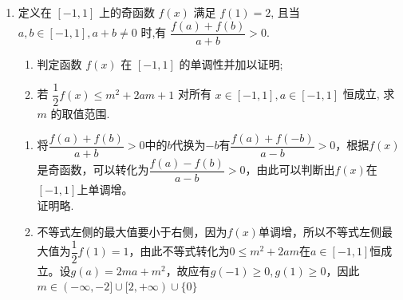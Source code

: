 \begin{enumerate}
\item 定义在 $[-1,1]$ 上的奇函数 $f(x)$ 满足 $f(1)=2$, 且当 $a, b \in[-1,1], a+b \neq 0$ 时,有 $\dfrac{f(a)+f(b)}{a+b}>0$.
\begin{enumerate}
    \item 判定函数 $f(x)$ 在 $[-1,1]$ 的单调性并加以证明;
    \item 若 $\dfrac{1}{2} f(x) \leq m^2+2 a m+1$ 对所有 $x \in[-1,1], a \in[-1,1]$ 恒成立, 求 $m$ 的取值范围.
\end{enumerate}
\begin{jieda}
    \begin{enumerate}
        \item 将$\dfrac{f(a)+f(b)}{a+b}>0$中的$b$代换为$-b$有$\dfrac{f(a)+f(-b)}{a-b}>0$，根据$f(x)$是奇函数，可以转化为$\dfrac{f(a)-f(b)}{a-b}>0$，由此可以判断出$f(x)$在$[-1, 1]$上单调增。 \\
        证明略.
        \item 不等式左侧的最大值要小于右侧，因为$f(x)$单调增，所以不等式左侧最大值为$\dfrac{1}{2}f(1) = 1$，由此不等式转化为$0 \leq m^2 + 2am$在$a \in [-1, 1]$恒成立。设$g(a) = 2ma+m^2$，故应有$g(-1) \geq 0, g(1) \geq 0$，因此$m \in (-\infty, -2] \cup [2, +\infty) \cup \{0\}$
    \end{enumerate}
\end{jieda}
\begin{vspace_}
   \vsp[4] 
\end{vspace_}

\end{enumerate}

